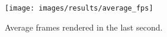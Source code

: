 
\begin{figure}[H]
	\centering
    \texttt{[image: images/results/average\_fps]}
    \caption[Average FPS]{Average frames rendered in the last second.}
    \label{fig:average_fps}
\end{figure}
